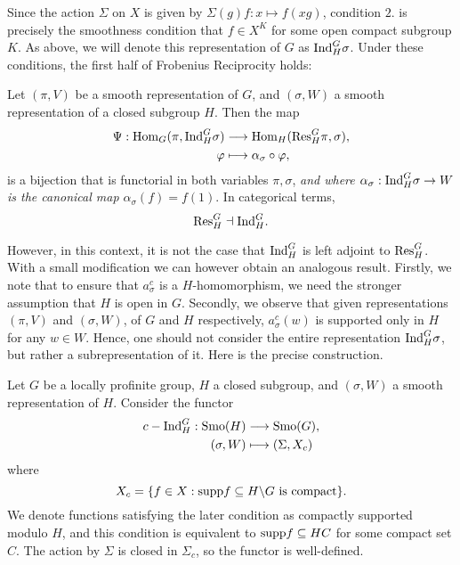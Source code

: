 Since the action $\Sigma$ on $X$ is given by $\Sigma(g)f:x\mapsto f(xg)$, condition $2.$ is precisely the smoothness condition that $f\in X^K$ for some open compact subgroup $K$. As above, we will denote this representation of $G$ as $\mathrm{Ind}_H^G\sigma$. Under these conditions, the first half of Frobenius Reciprocity holds:

\begin{thm}\label{thm:frob}
	Let $(\pi,V)$ be a smooth representation of $G$, and $(\sigma,W)$ a smooth representation of a closed subgroup $H$. Then the map
	\begin{align*}
		\Psi:\mathrm{Hom}_G(\pi, \mathrm{Ind}_H^G\sigma)&\longrightarrow \mathrm{Hom}_H(\mathrm{Res}_H^G \pi, \sigma),\\
		\varphi &\longmapsto \alpha_\sigma \circ \varphi,
	\end{align*}
    is a bijection that is functorial in both variables $\pi,\sigma$, \textit{and where $\alpha_\sigma:\mathrm{Ind}_H^G\sigma \to W$ is the canonical map $\alpha_\sigma(f) = f(1)$}. In categorical terms,
    $$\mathrm{Res}_H^G\dashv\mathrm{Ind}_H^G.$$
\end{thm}

However, in this context, it is not the case that $\mathrm{Ind}_H^G$ is left adjoint to $\mathrm{Res}_H^G$. With a small modification we can however obtain an analogous result. Firstly, we note that to ensure that $a_\sigma^c$ is a $H$-homomorphism, we need the stronger assumption that $H$ is open in $G$. Secondly, we observe that given representations $(\pi,V)$ and $(\sigma,W)$, of $G$ and $H$ respectively, $a_\sigma^c(w)$ is supported only in $H$ for any $w\in W$. Hence, one should not consider the entire representation $\mathrm{Ind}_H^G\sigma$, but rather a subrepresentation of it. Here is the precise construction.

\begin{defn}
	Let $G$ be a locally profinite group, $H$ a closed subgroup, and $(\sigma,W)$ a smooth representation of $H$. Consider the functor 
    \begin{align*}
        c-\mathrm{Ind}_H^G:\mathrm{Smo}(H)&\longrightarrow\mathrm{Smo}(G),\\
        (\sigma,W)&\longmapsto(\Sigma,X_c)
    \end{align*}
    where 
    $$X_c=\{f\in X: \mathrm{supp} f\subseteq H\backslash G \text{ is compact}\}.$$
    We denote functions satisfying the later condition as compactly supported modulo $H$, and this condition is equivalent to $\mathrm{supp} f\subseteq HC$ for some compact set $C$.
    The action by $\Sigma$ is closed in $\Sigma_c$, so the functor is well-defined.
\end{defn}

